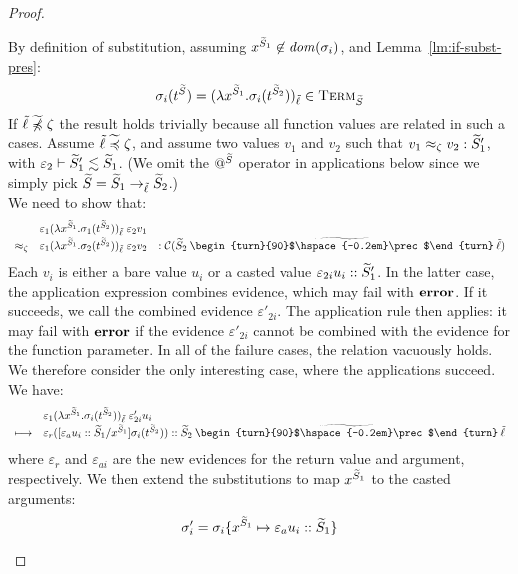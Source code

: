 \documentclass[authoryear,sort&compress,9pt,twocolumn,nocopyrightspace]{sigplanconf}
\makeatletter
\newcommand{\oblset}[1]{\textsc{#1}}
\newcommand{\dom}{\mathit{dom}}
\newcommand{\csub}{\lesssim}
\newcommand{\?}{\textsf{\upshape ?}} \newcommand{\consistent}[1]{\widetilde{#1}}
\newcommand{\ljoincore}{\begin{turn}{90}$\hspace{-0.2em}\prec$\end{turn}}
\newcommand{\cjoin}{\mathbin{\consistent{\ljoincore}}}
\newcommand{\cljoin}{\cjoin}
\newcommand{\TermT}[1]{\oblset{Term}_{#1}}
\newcommand{\cast}[2]{\evcast{\evpr{#1}}{#2}}
\newcommand{\error}{\textup{\textbf{error}}}
\newcommand{\red}{\longmapsto}
\newcommand{\iapp}[1]{\mathbin{@^{#1}}}
\newcommand{\ev}{\varepsilon}
\newcommand{\evcast}[2]{#1#2}
\newcommand{\evpr}[1]{\braket{#1}}
\newcommand{\ncsubl}{\not \hspace{-2mm}\csubl}
\newcommand{\lobs}{\zeta}
\newcommand{\rel}{\approx_{\lobs}}
\newcommand{\rcomp}[1]{\mathcal{C}(#1)}
\newcommand{\subst}{\sigma}
\newcommand{\itm}[1]{{t^{\cS_{#1}}}}
\renewcommand{\cast}[2]{#1#2}
\makeatother
\begin{document}
\begin{proof}
\begin{case}[$\lambda$]
\noindent By definition of substitution, assuming $x^{\cS_1} \not\in
\dom(\subst_i)$,  and Lemma~\ref{lm:if-subst-pres}:
\begin{displaymath}
\subst_i(\itm{}) = (\lambda x^{\cS_1}.\subst_i(t^{\cS_2}))_\clx \in
\TermT{\cS}
\end{displaymath}
If $\clx \ncsubl \lobs$ the result holds trivially because all
function values are related in such a cases. Assume
$\clx \csubl \lobs$, and assume two values $v_1$ and $v_2$ such that
$v_1 \rel v_2 : \cS'_1$, with $\ev_2 |- \cS'_1 \csub \cS_1$.  (We omit
the $\iapp{\cS}$ operator in applications below since we simply pick
$\cS = \cS_1 ->_\clx \cS_2$.)\\
We need to show that:
\begin{displaymath}
\begin{array}{rcl}
 & \cast{\ev_1}{(\lambda x^{\cS_1}.\subst_1(t^{\cS_2}))_\clx}  
\; \cast{\ev_2}{v_1} & \\
\rel &
\cast{\ev_1}{(\lambda
x^{\cS_1}.\subst_2(t^{\cS_2}))_\clx}
\; \cast{\ev_2}{v_2} &
: \rcomp{\cS_2 \cljoin \clx}
\end{array}
\end{displaymath}
Each $v_i$ is either a bare value $u_i$ or a casted value
$\cast{\ev_{2i}}{u_i} :: \cS'_1$. In the latter case, the application
expression combines evidence, which may fail with $\error$. If it
succeeds, we call the combined evidence $\ev'_{2i}$. The application rule then
applies: it may fail with $\error$ if the evidence $\ev'_{2i}$ cannot be
combined with the evidence for the function parameter. In all of the failure
cases, the relation vacuously holds. We therefore consider the only interesting
case, where the applications succeed. We have:
\begin{displaymath}
\begin{array}{rl}
 & \cast{\ev_1}{(\lambda x^{\cS_1}.\subst_i(t^{\cS_2}))_\clx} \;
\cast{\ev'_{2i}}{u_i}\\ 
\red & \cast{\ev_r}{([\cast{\ev_a}{u_i ::
                            \cS_1}/x^{\cS_1}] \subst_i(\itm{2}))}
:: \cS_2 \cljoin \clx
\end{array}
\end{displaymath}
where $\ev_r$ and $\ev_{ai}$ are the new evidences for the return
value and argument, respectively.
We then extend the substitutions to map $x^{\cS_1}$ to the casted
arguments:
\begin{displaymath}
\subst'_i = \subst_i \{ x^{\cS_1} \mapsto \cast{\ev_a}{u_i :: \cS_1} \}
\end{displaymath}

\end{case}
\end{proof}
\end{document}

